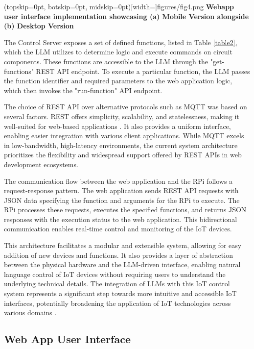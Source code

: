\documentclass{ieeeaccess}
\begin{document}
\Figure[t!](topskip=0pt, botskip=0pt,
midskip=0pt)[width=\textwidth]{{figures/fig4.png}}
{\centering \textbf{Webapp user interface implementation showcasing (a) Mobile Version alongside (b) Desktop Version}\label{fig4}}

The Control Server exposes a set of defined functions, listed in Table \ref{table2}, which the LLM utilizes to determine logic and execute commands on circuit components. These functions are accessible to the LLM through the "get-functions" REST API endpoint. To execute a particular function, the LLM passes the function identifier and required parameters to the web application logic, which then invokes the "run-function" API endpoint. 

The choice of REST API over alternative protocols such as MQTT was based on several factors. REST offers simplicity, scalability, and statelessness, making it well-suited for web-based applications \cite{s21206904}. It also provides a uniform interface, enabling easier integration with various client applications. While MQTT excels in low-bandwidth, high-latency environments, the current system architecture prioritizes the flexibility and widespread support offered by REST APIs in web development ecosystems.

The communication flow between the web application and the RPi follows a request-response pattern. The web application sends REST API requests with JSON data specifying the function and arguments for the RPi to execute. The RPi processes these requests, executes the specified functions, and returns JSON responses with the execution status to the web application. This bidirectional communication enables real-time control and monitoring of the IoT devices.

This architecture facilitates a modular and extensible system, allowing for easy addition of new devices and functions. It also provides a layer of abstraction between the physical hardware and the LLM-driven interface, enabling natural language control of IoT devices without requiring users to understand the underlying technical details. The integration of LLMs with this IoT control system represents a significant step towards more intuitive and accessible IoT interfaces, potentially broadening the application of IoT technologies across various domains \cite{taylor2010software}.

\subsection{Web App User Interface}
\end{document}
